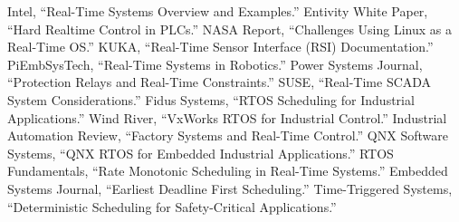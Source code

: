 \documentclass{article}
\begin{document}

\begin{thebibliography}{99}
     Intel, “Real-Time Systems Overview and Examples.”
     Entivity White Paper, “Hard Realtime Control in PLCs.”
     NASA Report, “Challenges Using Linux as a Real-Time OS.”
     KUKA, “Real-Time Sensor Interface (RSI) Documentation.”
     PiEmbSysTech, “Real-Time Systems in Robotics.”
     Power Systems Journal, “Protection Relays and Real-Time Constraints.”
     SUSE, “Real-Time SCADA System Considerations.”
     Fidus Systems, “RTOS Scheduling for Industrial Applications.”
     Wind River, “VxWorks RTOS for Industrial Control.”
     Industrial Automation Review, “Factory Systems and Real-Time Control.”
     QNX Software Systems, “QNX RTOS for Embedded Industrial Applications.”
     RTOS Fundamentals, “Rate Monotonic Scheduling in Real-Time Systems.”
     Embedded Systems Journal, “Earliest Deadline First Scheduling.”
     Time-Triggered Systems, “Deterministic Scheduling for Safety-Critical Applications.”
\end{thebibliography}
\end{document}
